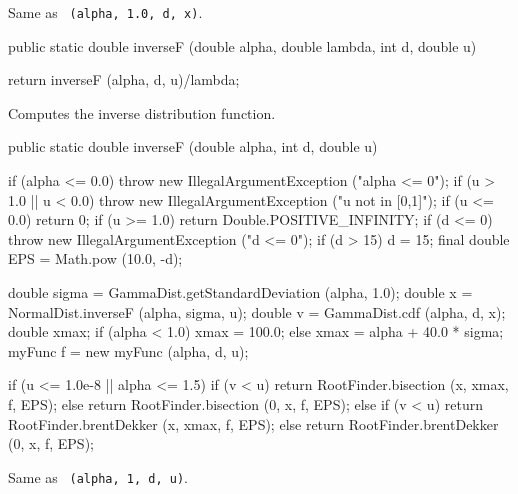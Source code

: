   \begin{tabb}
  Same as ~\texttt{(alpha, 1.0, d, x)}.
 \end{tabb}
\begin{code}

   public static double inverseF (double alpha, double lambda, int d,
                                  double u)\begin{hide} {
      return inverseF (alpha, d, u)/lambda;
   }\end{hide}
\end{code}
\begin{tabb}  Computes the inverse distribution function.
\end{tabb}
\begin{code}

   public static double inverseF (double alpha, int d, double u)\begin{hide} {
      if (alpha <= 0.0)
         throw new IllegalArgumentException ("alpha <= 0");
      if (u > 1.0 || u < 0.0)
         throw new IllegalArgumentException ("u not in [0,1]");
      if (u <= 0.0)
         return 0;
      if (u >= 1.0)
         return Double.POSITIVE_INFINITY;
      if (d <= 0)
         throw new IllegalArgumentException ("d <= 0");
      if (d > 15)
         d = 15;
      final double EPS = Math.pow (10.0, -d);

      double sigma = GammaDist.getStandardDeviation (alpha, 1.0);
      double x = NormalDist.inverseF (alpha, sigma, u);
      double v = GammaDist.cdf (alpha, d, x);
      double xmax;
      if (alpha < 1.0)
         xmax = 100.0;
      else
         xmax = alpha + 40.0 * sigma;
      myFunc f = new myFunc (alpha, d, u);

     if (u <= 1.0e-8 || alpha <= 1.5) {
         if (v < u)
            return RootFinder.bisection (x, xmax, f, EPS);
         else
            return RootFinder.bisection (0, x, f, EPS);
      } else {
          if (v < u)
            return RootFinder.brentDekker (x, xmax, f, EPS);
         else
            return RootFinder.brentDekker (0, x, f, EPS);
      }
   }\end{hide}
\end{code}
\begin{tabb} Same as
~\texttt{(alpha, 1, d, u)}.
\end{tabb}
